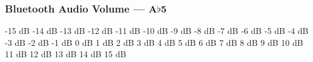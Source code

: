\subsubsection{Bluetooth Audio Volume --- A$\flat$5}


























-15 dB
-14 dB
-13 dB
-12 dB
-11 dB
-10 dB
-9 dB
-8 dB
-7 dB
-6 dB
-5 dB
-4 dB
-3 dB
-2 dB
-1 dB
0 dB
1 dB
2 dB
3 dB
4 dB
5 dB
6 dB
7 dB
8 dB
9 dB
10 dB
11 dB
12 dB
13 dB
14 dB
15 dB

